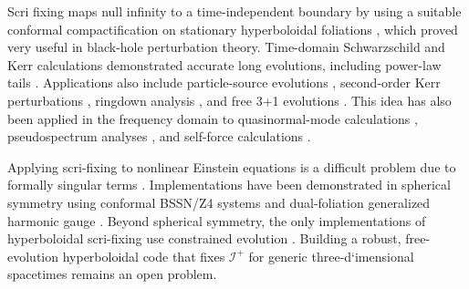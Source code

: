 \documentclass[
 aps,
 prd,
 reprint,
 superscriptaddress,
 nofootinbib,
 longbibliography
]{revtex4-2}
\newcommand{\scri}{\mathscr{I}}
\begin{document}
Scri fixing maps null infinity to a time-independent boundary by using a suitable conformal compactification on stationary hyperboloidal foliations \cite{zenginoglu_hyperboloidal_2008}, which proved very useful in black-hole perturbation theory. Time-domain Schwarzschild and Kerr calculations demonstrated accurate long evolutions, including power-law tails \cite{zengin2008hyperboloidal,ZenginogluNunezHusa:2009,
ZenginogluTiglio:2009,RaczToth:2011,Bernuzzi:2011aj,
ZenginogluKhanna:2011,HarmsBernuzziBrugmann:2013,PanossoMacedoAnsorg:2014,
Harms:2014dqa,CsukasRaczToth:2019}.
Applications also include particle-source evolutions
\cite{GomesDaSilvaEtAl:2023,VaswaniEtAl:2026}, second-order Kerr perturbations
\cite{RipleyEtAl:2021}, ringdown analysis \cite{ZhuEtAl:2024}, and free
3+1 evolutions \cite{ZenginogluKidder:2010, ZenginogluGalley:2012, yang2013quasinormal, Peterson:2023bha,Rinne:2025nonlinear,
ZenginogluBernuzziNutzi:2026}. This idea has also been applied in the
frequency domain to quasinormal-mode calculations
\cite{Zenginoglu:2011jz,AnsorgMacedo:2016,MacedoJaramilloAnsorg:2018,
Macedo:2020,PanossoMacedo:2024nkw,BessonJaramillo:2025}, pseudospectrum analyses
\cite{JaramilloMacedoAlSheikh:2021,GasperinJaramillo:2022,
DestounisBoyanovMacedo:2024}, and self-force calculations
\cite{MacedoEtAl:2022,MacedoEtAl:2024selfforce,Leather:2025selfforce,
LeatherEtAl:2026Teukolsky}.

Applying scri-fixing to nonlinear Einstein equations is a difficult problem due to formally singular terms \cite{Frauendiener:2000mk, Zenginoglu:2008pw}. Implementations have been demonstrated in spherical symmetry using conformal BSSN/Z4 systems
\cite{Vano-Vinuales:2014koa,Vano-Vinuales:2017qij,
VanoVinuales:2024reference,Alvares:2025emkg} and 
dual-foliation generalized harmonic gauge \cite{Hilditch:2015aba,HilditchEtAl:2018,DuarteEtAl:2023,
Peterson:2024spherical,Peterson:2025strong}. Beyond spherical symmetry, the only implementations of hyperboloidal scri-fixing use constrained evolution \cite{Moncrief:2008ie,Rinne:2009qx,RinneMoncrief:2013,
BuchmanPfeifferBardeen:2009,BardeenSarbachBuchman:2011}. Building a robust, free-evolution hyperboloidal code that
fixes $\scri^+$ for generic three-d`imensional spacetimes remains an open problem.
\end{document}
